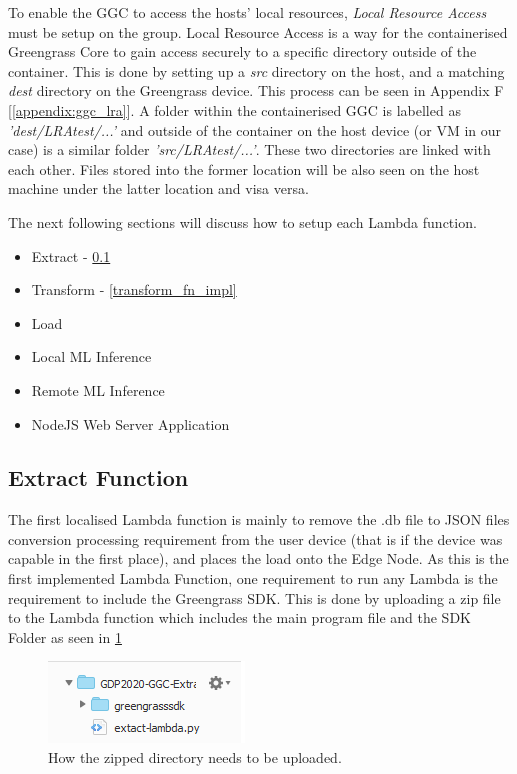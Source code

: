 To enable the GGC to access the hosts' local resources, \textit{Local Resource Access} must be setup on the group. Local Resource Access is a way for the containerised Greengrass Core to gain access securely to a specific directory outside of the container. This is done by setting up a \textit{src} directory on the host, and a matching \textit{dest} directory on the Greengrass device. This process can be seen in Appendix F [\ref{appendix:ggc_lra}]. A folder within the containerised GGC is labelled as \textit{'dest/LRAtest/...'} and outside of the container on the host device (or VM in our case) is a similar folder \textit{'src/LRAtest/...'}. These two directories are linked with each other. Files stored into the former location will be also seen on the host machine under the latter location and visa versa.

The next following sections will discuss how to setup each Lambda function.
\begin{itemize}
    \item Extract - \ref{extract_fn_impl}
    \item Transform - \ref{transform_fn_impl}
    \item Load
    \item Local ML Inference
    \item Remote ML Inference
    \item NodeJS Web Server Application
\end{itemize}


\subsection{Extract Function}
\label{extract_fn_impl}
The first localised Lambda function is mainly to remove the .db file to JSON files conversion processing requirement from the user device (that is if the device was capable in the first place), and places the load onto the Edge Node. As this is the first implemented Lambda Function, one requirement to run any Lambda is the requirement to include the Greengrass SDK. This is done by uploading a zip file to the Lambda function which includes the main program file and the SDK Folder as seen in \ref{fig:ggc_sdk_inclusion}
\begin{figure}[ht]
    \centering
    \includegraphics{pages/Chapter4/Chapter 4 Images/LambdaFns/ggc_sdk_inclusion.png}
    \caption{How the zipped  directory needs to be uploaded.}
    \label{fig:ggc_sdk_inclusion}
\end{figure}


